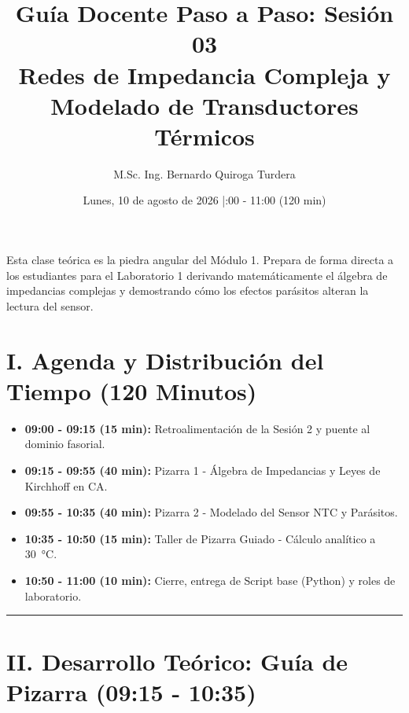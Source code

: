 \documentclass[11pt,a4paper]{article}
\title{\vspace{-1.5cm}\Large\textbf{Guía Docente Paso a Paso: Sesión 03}\\
\large Redes de Impedancia Compleja y Modelado de Transductores Térmicos}
\author{M.Sc. Ing. Bernardo Quiroga Turdera}
\date{Lunes, 10 de agosto de 2026 \quad|\quad 09:00 - 11:00 (120 min)}
\begin{document}
\maketitle
\vspace{-1cm}

\begin{justificacion}
Esta clase teórica es la piedra angular del Módulo 1. Prepara de forma directa a los estudiantes para el Laboratorio 1 derivando matemáticamente el álgebra de impedancias complejas y demostrando cómo los efectos parásitos alteran la lectura del sensor.
\end{justificacion}

\section*{I. Agenda y Distribución del Tiempo (120 Minutos)}
\begin{itemize}[label=$\circ$, itemsep=2pt]
    \item \textbf{09:00 - 09:15 (15 min):} Retroalimentación de la Sesión 2 y puente al dominio fasorial.
    \item \textbf{09:15 - 09:55 (40 min):} Pizarra 1 - Álgebra de Impedancias y Leyes de Kirchhoff en CA.
    \item \textbf{09:55 - 10:35 (40 min):} Pizarra 2 - Modelado del Sensor NTC y Parásitos.
    \item \textbf{10:35 - 10:50 (15 min):} Taller de Pizarra Guiado - Cálculo analítico a \qty{30}{\celsius}.
    \item \textbf{10:50 - 11:00 (10 min):} Cierre, entrega de Script base (Python) y roles de laboratorio.
\end{itemize}

\vspace{0.5cm}
\hrule
\vspace{0.5cm}

\section*{II. Desarrollo Teórico: Guía de Pizarra (09:15 - 10:35)}
\end{document}

